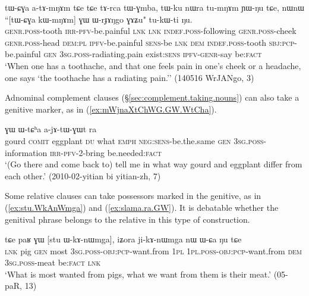 \begin{exe}
\ex \label{ex:tWCGA.kWmNAm.GW.WrJAnNgo}
\gll tɯ-ɕɣa a-tɤ-mŋɤm tɕe tɕe tɤ-rca tɯ-ɣmba, tɯ-ku nɯra tu-mŋɤm ɲɯ-ŋu tɕe,  nɯnɯ ``[tɯ-ɕɣa kɯ-mŋɤm] ɣɯ ɯ-rɟɤŋgo ɣɤʑu" tu-kɯ-ti ŋu. \\
\textsc{genr}.\textsc{poss}-tooth \textsc{irr}-\textsc{pfv}-be.painful \textsc{lnk} \textsc{lnk} \textsc{indef}.\textsc{poss}-following \textsc{genr}.\textsc{poss}-cheek \textsc{genr}.\textsc{poss}-head \textsc{dem}:\textsc{pl} \textsc{ipfv}-be.painful \textsc{sens}-be \textsc{lnk} \textsc{dem} \textsc{indef}.\textsc{poss}-tooth \textsc{sbj}:\textsc{pcp}-be.painful \textsc{gen} \textsc{3sg}.\textsc{poss}-radiating.pain exist:\textsc{sens} \textsc{ipfv}-\textsc{genr}-say be:\textsc{fact} \\
\glt `When one has a toothache, and that one feels pain in one's cheek or a headache, one says `the toothache has a radiating pain.'' (140516 WrJANgo, 3)
\end{exe}

Adnominal complement clauses (§\ref{sec:complement.taking.nouns}) can also take a genitive marker, as in (\ref{ex:mWjnaXtChWG.GW.WtCha}).

\begin{exe}
\ex \label{ex:mWjnaXtChWG.GW.WtCha}
 ɣɯ ɯ-tɕʰa a-jɤ-tɯ-ɣɯt ra \\
gourd \textsc{comit} eggplant \textsc{du} what \textsc{emph} \textsc{neg}:\textsc{sens}-be.the.same \textsc{gen} \textsc{3sg}.\textsc{poss}-information \textsc{irr}-\textsc{pfv}-2-bring be.needed:\textsc{fact} \\
\glt `(Go there and come back to) tell me in what way gourd and eggplant differ from each other.' (2010-02-yitian bi yitian-zh, 7)
\end{exe}

Some relative clauses can take possessors marked in the genitive, as in  (\ref{ex:stu.WkAnWmga}) and (\ref{ex:slama.ra.GW}). It is debatable whether the genitival phrase belongs to the relative in this type of construction.

\begin{exe}
\ex \label{ex:stu.WkAnWmga}
 \gll tɕe paʁ ɣɯ [stu ɯ-kɤ-nɯmga], iʑora ji-kɤ-nɯmga nɯ ɯ-ɕa ŋu tɕe \\
 \textsc{lnk} pig \textsc{gen} most \textsc{3sg}.\textsc{poss}-\textsc{obj}:\textsc{pcp}-want.from \textsc{1pl} \textsc{1pl}.\textsc{poss}-\textsc{obj}:\textsc{pcp}-want.from \textsc{dem} \textsc{3sg}.\textsc{poss}-meat be:\textsc{fact} \textsc{lnk} \\
\glt  `What is most wanted from pigs, what we want from them is their meat.' (05-paR, 13)
\end{exe}

